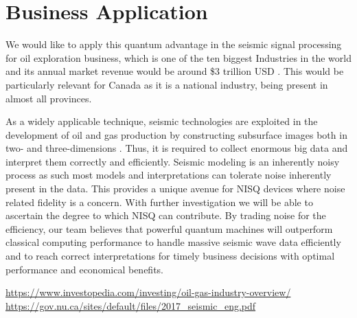 \documentclass[12pt]{article}
\begin{document}
\section*{Business Application}

We would like to apply this quantum advantage in the seismic signal processing for oil exploration business, which is one of the ten biggest Industries in the world and its annual market revenue would be around \$3 trillion USD \cite{oil_industry}. This would be particularly relevant for Canada as it is a national industry, being present in almost all provinces. 

As a widely applicable technique, seismic technologies are exploited in the development of oil and gas production by constructing subsurface images both in two- and three-dimensions \cite{subsurface_img}. Thus, it is required to collect enormous big data and interpret them correctly and efficiently. 
Seismic modeling is an inherently noisy process as such most models and interpretations can tolerate noise inherently present in the data. This provides a unique avenue for NISQ devices where noise related fidelity is a concern. With further investigation we will be able to ascertain the degree to which NISQ can contribute. 
By trading noise for the efficiency, our team believes that powerful quantum machines will outperform classical computing performance to handle massive seismic wave data efficiently and to reach correct interpretations for timely business decisions with optimal performance and economical benefits.

\begin{thebibliography}{10}

 \href{https://www.investopedia.com/investing/oil-gas-industry-overview/}{https://www.investopedia.com/investing/oil-gas-industry-overview/}
 \href{https://gov.nu.ca/sites/default/files/2017_seismic_eng.pdf}{https://gov.nu.ca/sites/default/files/2017\_seismic\_eng.pdf}
\end{thebibliography}
\end{document}
